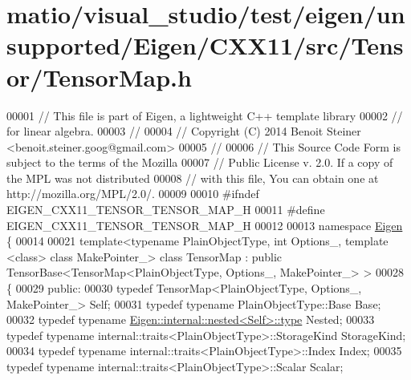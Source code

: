 \hypertarget{matio_2visual__studio_2test_2eigen_2unsupported_2_eigen_2_c_x_x11_2src_2_tensor_2_tensor_map_8h_source}{}\section{matio/visual\+\_\+studio/test/eigen/unsupported/\+Eigen/\+C\+X\+X11/src/\+Tensor/\+Tensor\+Map.h}
\label{matio_2visual__studio_2test_2eigen_2unsupported_2_eigen_2_c_x_x11_2src_2_tensor_2_tensor_map_8h_source}

\begin{DoxyCode}
00001 \textcolor{comment}{// This file is part of Eigen, a lightweight C++ template library}
00002 \textcolor{comment}{// for linear algebra.}
00003 \textcolor{comment}{//}
00004 \textcolor{comment}{// Copyright (C) 2014 Benoit Steiner <benoit.steiner.goog@gmail.com>}
00005 \textcolor{comment}{//}
00006 \textcolor{comment}{// This Source Code Form is subject to the terms of the Mozilla}
00007 \textcolor{comment}{// Public License v. 2.0. If a copy of the MPL was not distributed}
00008 \textcolor{comment}{// with this file, You can obtain one at http://mozilla.org/MPL/2.0/.}
00009 
00010 \textcolor{preprocessor}{#ifndef EIGEN\_CXX11\_TENSOR\_TENSOR\_MAP\_H}
00011 \textcolor{preprocessor}{#define EIGEN\_CXX11\_TENSOR\_TENSOR\_MAP\_H}
00012 
00013 \textcolor{keyword}{namespace }\hyperlink{namespace_eigen}{Eigen} \{
00014 
00021 \textcolor{keyword}{template}<\textcolor{keyword}{typename} PlainObjectType, \textcolor{keywordtype}{int} Options\_, \textcolor{keyword}{template} <\textcolor{keyword}{class}> \textcolor{keyword}{class }MakePointer\_> \textcolor{keyword}{class }TensorMap : \textcolor{keyword}{
      public} TensorBase<TensorMap<PlainObjectType, Options\_, MakePointer\_> >
00028 \{
00029   \textcolor{keyword}{public}:
00030     \textcolor{keyword}{typedef} TensorMap<PlainObjectType, Options\_, MakePointer\_> Self;
00031     \textcolor{keyword}{typedef} \textcolor{keyword}{typename} PlainObjectType::Base Base;
00032     \textcolor{keyword}{typedef} \textcolor{keyword}{typename} \hyperlink{class_eigen_1_1internal_1_1_tensor_lazy_evaluator_writable}{Eigen::internal::nested<Self>::type} Nested;
00033     \textcolor{keyword}{typedef} \textcolor{keyword}{typename} internal::traits<PlainObjectType>::StorageKind StorageKind;
00034     \textcolor{keyword}{typedef} \textcolor{keyword}{typename} internal::traits<PlainObjectType>::Index Index;
00035     \textcolor{keyword}{typedef} \textcolor{keyword}{typename} internal::traits<PlainObjectType>::Scalar Scalar;

\end{DoxyCode}
